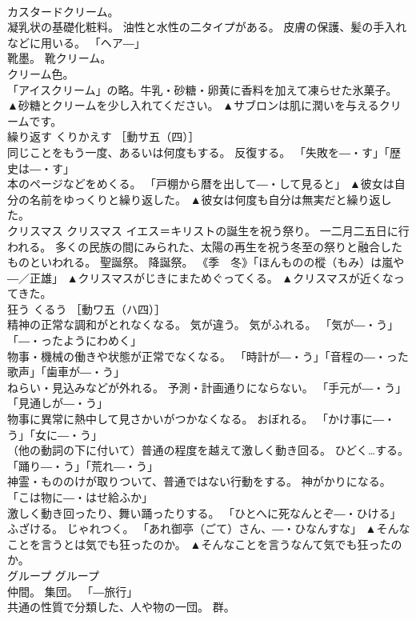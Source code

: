 \documentclass[8pt]{extreport}
\begin{document}
\begin{CJK}{UTF8}{min}
\\	カスタードクリーム。 
\\	凝乳状の基礎化粧料。 油性と水性の二タイプがある。 皮膚の保護、髪の手入れなどに用いる。 「ヘア―」 
\\	靴墨。 靴クリーム。 
\\	クリーム色。 
\\	「アイスクリーム」の略。牛乳・砂糖・卵黄に香料を加えて凍らせた氷菓子。	▲砂糖とクリームを少し入れてください。 ▲サブロンは肌に潤いを与えるクリームです。
\\	繰り返す	くりかえす	［動サ五（四）］ 
\\	同じことをもう一度、あるいは何度もする。 反復する。 「失敗を―・す」「歴史は―・す」 
\\	本のページなどをめくる。 「戸棚から暦を出して―・して見ると」	▲彼女は自分の名前をゆっくりと繰り返した。 ▲彼女は何度も自分は無実だと繰り返した。
\\	クリスマス	クリスマス	イエス＝キリストの誕生を祝う祭り。 一二月二五日に行われる。 多くの民族の間にみられた、太陽の再生を祝う冬至の祭りと融合したものといわれる。 聖誕祭。 降誕祭。 《季　冬》「ほんものの樅（もみ）は嵐や―／正雄」	▲クリスマスがじきにまためぐってくる。 ▲クリスマスが近くなってきた。
\\	狂う	くるう	［動ワ五（ハ四）］ 
\\	精神の正常な調和がとれなくなる。 気が違う。 気がふれる。 「気が―・う」「―・ったようにわめく」 
\\	物事・機械の働きや状態が正常でなくなる。 「時計が―・う」「音程の―・った歌声」「歯車が―・う」 
\\	ねらい・見込みなどが外れる。 予測・計画通りにならない。 「手元が―・う」「見通しが―・う」 
\\	物事に異常に熱中して見さかいがつかなくなる。 おぼれる。 「かけ事に―・う」「女に―・う」 
\\	（他の動詞の下に付いて）普通の程度を越えて激しく動き回る。 ひどく…する。 「踊り―・う」「荒れ―・う」 
\\	神霊・もののけが取りついて、普通ではない行動をする。 神がかりになる。 「こは物に―・はせ給ふか」 
\\	激しく動き回ったり、舞い踊ったりする。 「ひとへに死なんとぞ―・ひける」 
\\	ふざける。 じゃれつく。 「あれ御亭（ごて）さん、―・ひなんすな」	▲そんなことを言うとは気でも狂ったのか。 ▲そんなことを言うなんて気でも狂ったのか。
\\	グループ	グループ	
\\	仲間。 集団。 「―旅行」 
\\	共通の性質で分類した、人や物の一団。 群。 

\end{CJK}
\end{document}

